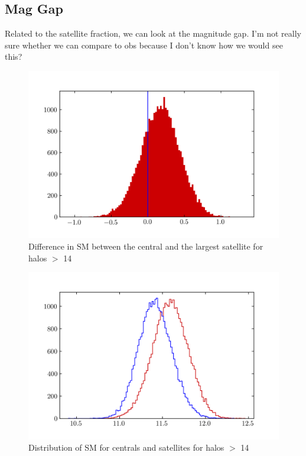 \documentclass{article}
\begin{document}
\subsection{Mag Gap}
Related to the satellite fraction, we can look at the magnitude gap. I'm not really sure whether we can compare to obs because I don't know how we would see this?
\begin{figure}[h]
    \includegraphics[width=\textwidth]{images/mag_gap1.png}
    \caption{Difference in SM between the central and the largest satellite for halos $>$ 14}
\end{figure}

\begin{figure}[h]
    \includegraphics[width=\textwidth]{images/mag_gap2.png}
    \caption{Distribution of SM for centrals and satellites for halos $>$ 14}
\end{figure}



\end{document}
